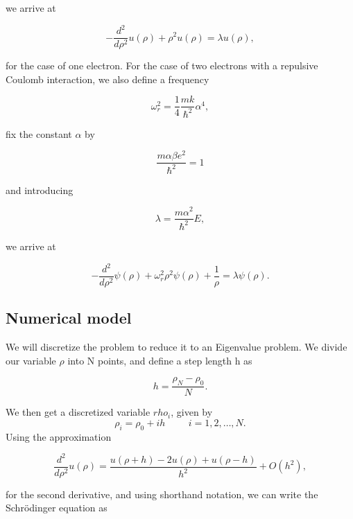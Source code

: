 \documentclass{emulateapj}
\begin{document}
we arrive at

\begin{equation}
  -\frac{d^2}{d\rho^2} u(\rho) + \rho^2u(\rho)  = \lambda u(\rho),
\end{equation}

for the case of one electron. For the case of two electrons with a repulsive Coulomb interaction, we also define a frequency

\begin{equation}
\omega_r^2=\frac{1}{4}\frac{mk}{\hbar^2} \alpha^4,
\end{equation}

fix the constant $\alpha$ by

\begin{equation}
\frac{m\alpha \beta e^2}{\hbar^2}=1
\end{equation}

and introducing

\begin{equation}
\lambda = \frac{m\alpha^2}{\hbar^2}E,
\end{equation}

we arrive at

\begin{equation}
  -\frac{d^2}{d\rho^2} \psi(\rho) + \omega_r^2\rho^2\psi(\rho) +\frac{1}{\rho} = \lambda \psi(\rho).
\end{equation}

\subsection{Numerical model}
We will discretize the problem to reduce it to an Eigenvalue problem. We divide our variable $\rho$ into N points, and define a step length h as

\begin{equation}
  h=\frac{\rho_N-\rho_0 }{N}.
\end{equation}

We then get a discretized variable $rho_i$, given by
\[
    \rho_i= \rho_0 + ih \hspace{1cm} i=1,2,\dots , N.
\]
Using the approximation

\begin{equation}
    \frac{d^2}{d\rho^2} u(\rho) =\frac{u(\rho+h) -2u(\rho) +u(\rho-h)}{h^2} +O(h^2),
    \label{eq:diffoperation}
\end{equation}

for the second derivative, and using shorthand notation, we can write the Schrödinger equation as
\end{document}
